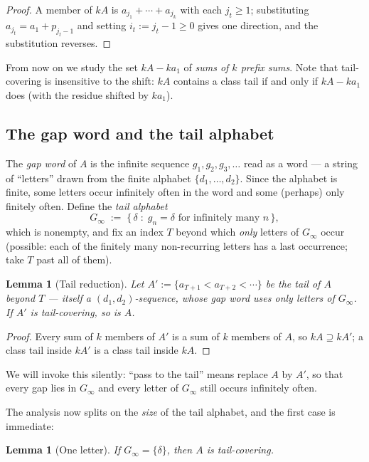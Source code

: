 \documentclass[11pt,reqno]{amsart}
\theoremstyle{plain}
\newtheorem{lemma}[theorem]{Lemma}
\theoremstyle{definition}
\theoremstyle{remark}
\newcommand{\Ginf}{G_\infty}
\begin{document}
\begin{proof}
A member of $kA$ is $a_{j_1} + \cdots + a_{j_k}$ with each $j_t \ge 1$; substituting
$a_{j_t} = a_1 + p_{j_t - 1}$ and setting $i_t := j_t - 1 \ge 0$ gives one direction,
and the substitution reverses.
\end{proof}

From now on we study the set $kA - k a_1$ of \emph{sums of $k$ prefix sums}. Note
that tail-covering is insensitive to the shift: $kA$ contains a class tail if and
only if $kA - k a_1$ does (with the residue shifted by $k a_1$).

\subsection{The gap word and the tail alphabet}

The \emph{gap word} of $A$ is the infinite sequence $g_1, g_2, g_3, \dots$ read as a
word --- a string of ``letters'' drawn from the finite alphabet
$\{d_1, \dots, d_2\}$. Since the alphabet is finite, some letters occur infinitely
often in the word and some (perhaps) only finitely often. Define the \emph{tail
alphabet}
\[
  \Ginf \;:=\; \{\, \delta \;:\; g_n = \delta \text{ for infinitely many } n \,\} ,
\]
which is nonempty, and fix an index $T$ beyond which \emph{only} letters of $\Ginf$
occur (possible: each of the finitely many non-recurring letters has a last
occurrence; take $T$ past all of them).

\begin{lemma}[Tail reduction]\label{lem:tail-friendly}
Let $A' := \{a_{T+1} < a_{T+2} < \cdots\}$ be the tail of $A$ beyond $T$ --- itself a
$(d_1,d_2)$-sequence, whose gap word uses only letters of $\Ginf$. If $A'$ is
tail-covering, so is $A$.
\end{lemma}

\begin{proof}
Every sum of $k$ members of $A'$ is a sum of $k$ members of $A$, so
$kA \supseteq kA'$; a class tail inside $kA'$ is a class tail inside $kA$.
\end{proof}

We will invoke this silently: ``pass to the tail'' means replace $A$ by $A'$, so
that every gap lies in $\Ginf$ and every letter of $\Ginf$ still occurs infinitely
often.

The analysis now splits on the \emph{size} of the tail alphabet, and the first case
is immediate:

\begin{lemma}[One letter]\label{lem:oneletter-friendly}
If $\Ginf = \{\delta\}$, then $A$ is tail-covering.
\end{lemma}
\end{document}
